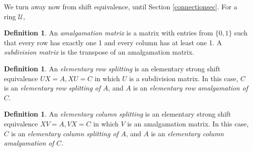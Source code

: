 \documentclass{amsart}
\theoremstyle{definition}
\newtheorem{definition}[theorem]{Definition}
\theoremstyle{remark}
\numberwithin{equation}{section}
\begin{document}
We turn away now from shift equivalence, until Section 
\ref{connectionsec}. 
For a ring $\mathcal U$, 
\begin{definition} 
An {\it amalgamation matrix} is a matrix with entries from $\{0,1\}$  such that every row has exactly 
one 1 and every column has at least one 1. A {\it subdivision matrix} is the transpose of an amalgamation matrix. 
\end{definition} 

\begin{definition} 
An {\it elementary row splitting} is an 
elementary strong shift equivalence 
$UX=A,XU=C$ in which $U$ is a subdivision matrix. 
In this case, $C$ is an {\it elementary row splitting
of $A$}, and $A$ is an {\it elementary row amalgamation of $C$}. 
\end{definition} 

\begin{definition} 
An {\it elementary column splitting} is an 
elementary strong shift equivalence 
$XV=A,VX=C$ in which $V$ is an amalgamation matrix. 
In this case, $C$ is an {\it elementary column splitting
of $A$}, and $A$ is an {\it elementary column amalgamation of $C$}. 
\end{definition} 
\end{document}
